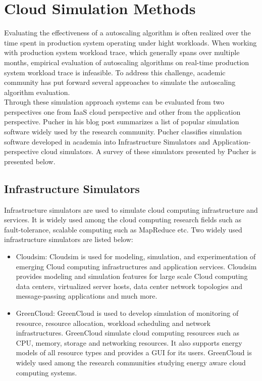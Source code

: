 \section{Cloud Simulation Methods}
\label{sec:Cloud Simulation Methods}
Evaluating the effectiveness of a autoscaling algorithm is often realized over the time spent in production system operating under hight workloads\cite{AlexanderSim}. When working with production system workload trace, which generally spans over multiple months, empirical evaluation of autoscaling algorithms on real-time production system workload trace is infeasible. To address this challenge, academic community has put forward several approaches to simulate the autoscaling algorithm evaluation.
\\
Through these simulation approach systems can be evaluated from two perspectives one from IaaS cloud perspective and other from the application perspective. Pucher\cite{AlexanderSim} in his blog post summarizes a list of popular simulation software widely used by the research community. Pucher\cite{AlexanderSim} classifies simulation software developed in academia into Infrastructure Simulators and Application-perspective cloud simulators. A survey of these simulators presented by Pucher\cite{AlexanderSim} is presented below.
\subsection{Infrastructure Simulators}
\label{sub:Infrastructure Simulators}
Infrastructure simulators are used to simulate cloud computing infrastructure and services. It is widely used among the cloud computing research fields such as fault-tolerance, scalable computing such as MapReduce\cite{dean2008mapreduce} etc. Two widely used infrastructure simulators are listed below:
\begin{itemize}
  \item Cloudsim\cite{calheiros2011cloudsim}: Cloudsim is used for modeling, simulation, and experimentation of emerging Cloud computing infrastructures and application services. Cloudsim provides modeling and simulation features for large scale Cloud computing data centers\cite{Cloudsim}, virtualized server hosts\cite{Cloudsim}, data center network topologies and message-passing applications\cite{Cloudsim} and much more.
  \item GreenCloud\cite{kliazovich2012greencloud}: GreenCloud is used to develop simulation of monitoring of resource, resource allocation, workload scheduling and network infrastructures\cite{Greencloud}. GreenCloud simulate cloud computing resources such as CPU, memory, storage and networking resources. It also supports energy models of all resource types and provides a GUI for its users. GreenCloud is widely used among the research communities studying energy aware cloud computing systems.
\end{itemize}

